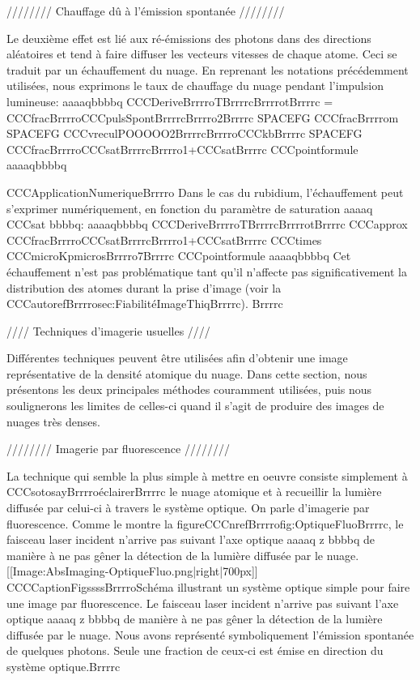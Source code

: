 //////// Chauffage dû à l'émission spontanée ////////

Le deuxième effet est lié aux ré-émissions des photons dans des directions aléatoires et tend à faire diffuser les vecteurs vitesses de chaque atome. Ceci se traduit par un échauffement du nuage. En reprenant les notations précédemment utilisées, nous exprimons le taux de chauffage du nuage pendant l'impulsion lumineuse:
aaaaqbbbbq
CCCDeriveBrrrroTBrrrrcBrrrrotBrrrrc = CCCfracBrrrroCCCpulsSpontBrrrrcBrrrro2Brrrrc SPACEFG CCCfracBrrrrom SPACEFG CCCvreculPOOOOO2BrrrrcBrrrroCCCkbBrrrrc  SPACEFG  CCCfracBrrrroCCCsatBrrrrcBrrrro1+CCCsatBrrrrc
CCCpointformule
aaaaqbbbbq

CCCApplicationNumeriqueBrrrro
Dans le cas du rubidium, l'échauffement peut s'exprimer numériquement, en fonction du paramètre de saturation aaaaq CCCsat bbbbq:
aaaaqbbbbq
CCCDeriveBrrrroTBrrrrcBrrrrotBrrrrc CCCapprox CCCfracBrrrroCCCsatBrrrrcBrrrro1+CCCsatBrrrrc CCCtimes CCCmicroKpmicrosBrrrro7Brrrrc 
CCCpointformule
aaaaqbbbbq
Cet échauffement n'est pas problématique tant qu'il n'affecte pas significativement la distribution des atomes durant la prise d'image (voir la CCCautorefBrrrrosec:FiabilitéImageThiqBrrrrc).
Brrrrc



//// Techniques d'imagerie usuelles ////

Différentes techniques peuvent être utilisées afin d'obtenir une image représentative de la densité atomique du nuage. Dans cette section, nous présentons les deux principales méthodes couramment utilisées, puis nous soulignerons les limites de celles-ci quand il s'agit de produire des images de nuages très denses.


//////// Imagerie par fluorescence ////////

La technique qui semble la plus simple à mettre en oeuvre consiste simplement à CCCsotosayBrrrroéclairerBrrrrc le nuage atomique et à recueillir la lumière diffusée par celui-ci à travers le système optique. On parle d'imagerie par fluorescence.
Comme le montre la figureCCCnrefBrrrrofig:OptiqueFluoBrrrrc, le faisceau laser incident n'arrive pas suivant l'axe optique aaaaq z bbbbq de manière à ne pas gêner la détection de la lumière diffusée par le nuage.
[[Image:AbsImaging-OptiqueFluo.png|right|700px]]
CCCCaptionFigssssBrrrroSchéma illustrant un système optique simple pour faire une image par fluorescence. Le faisceau laser incident n'arrive pas suivant l'axe optique aaaaq z bbbbq de manière à ne pas gêner la détection de la lumière diffusée par le nuage. Nous avons représenté symboliquement l'émission spontanée de quelques photons. Seule une fraction de ceux-ci est émise en direction du système optique.Brrrrc


